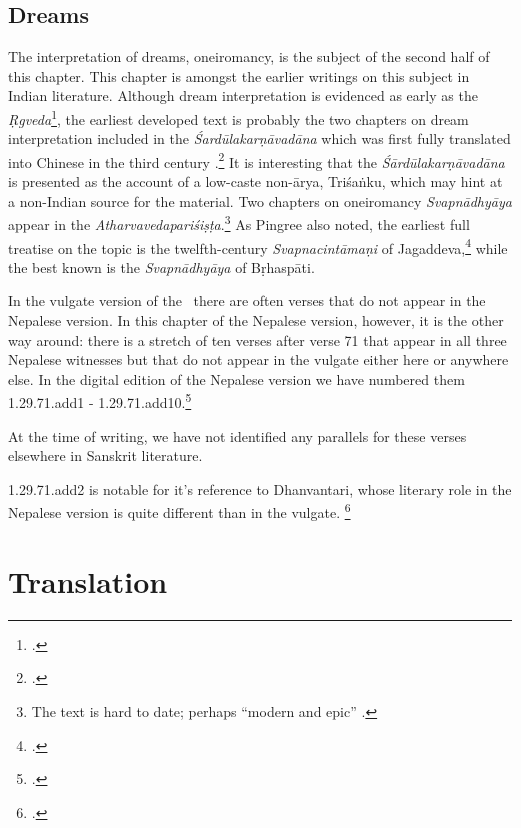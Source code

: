 \subsection{Dreams}

The interpretation of dreams, oneiromancy, is the subject of the
second half of this chapter. %
This chapter is amongst the earlier writings on this subject in Indian
literature.  Although dream interpretation is evidenced as early as
the \emph{Ṛgveda}\footcite[77, n.\,68]{ping-1981}, the earliest
developed text is probably the two chapters on dream interpretation
included in the \emph{Śardūlakarṇāvadāna}
which was first fully translated into Chinese in the third century
\CE.\footcites{mukh-1954}[154-161, 161-164]{crui-2025}  It is
interesting that the \emph{Śārdūlakarṇāvadāna} is presented as the
account of a low-caste non-ārya, Triśaṅku, which may hint at a
non-Indian source for the material.  Two chapters on oneiromancy
\emph{Svapnādhyāya} appear in the
\emph{Atharvavedapariśiṣṭa}.\footnote{The text is hard to date;
    perhaps “modern and epic” \citep[767]{keit-1912}.}
    As Pingree also noted, the earliest full treatise on the topic is the
    twelfth-century
   \emph{Svapnacintāmaṇi}
   of
    Jagaddeva,\footcites{nege-1912,sova-2025} while the best known
    is the \emph{Svapnādhyāya} of Bṛhaspāti.
    
        
In the vulgate version of the \SS\ there are often verses that do not
appear in the Nepalese version.  In this chapter of the Nepalese
version, however, it is the other way around: there is a stretch of
ten verses after verse 71 that appear in all three Nepalese witnesses
but that do not appear in the vulgate either here or anywhere else.  In
the digital edition of the Nepalese version we have numbered them
1.29.71.add1 - 1.29.71.add10.\footcite{wuja-2026}
          
At the time of writing, we have not identified any parallels for these verses 
elsewhere in Sanskrit literature.
            
1.29.71.add2 is notable for it's reference to Dhanvantari,
whose literary role in the Nepalese version is quite
different than in the vulgate. \footcite{birc-2021a}


\section{Translation}
    
\begin{translation}    
    \item [1] 
\end{translation}